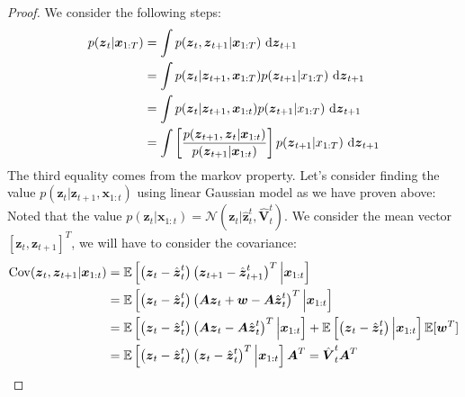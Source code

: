 \begin{proof}
    We consider the following steps:
    \begin{equation*}
    \begin{aligned}
        p(\boldsymbol z_t | \boldsymbol x_{1:T}) &= \int p(\boldsymbol z_t, \boldsymbol z_{t+1} | \boldsymbol x_{1:T})\ \mathrm{d} \boldsymbol z_{t+1} \\
        &= \int p(\boldsymbol z_t | \boldsymbol z_{t+1}, \boldsymbol x_{1:T}) p(\boldsymbol z_{t+1} | x_{1:T}) \ \mathrm{d} \boldsymbol z_{t+1} \\
        &= \int p(\boldsymbol z_t | \boldsymbol z_{t+1}, \boldsymbol x_{1:t}) p(\boldsymbol z_{t+1} | x_{1:T}) \ \mathrm{d} \boldsymbol z_{t+1} \\
        &= \int \left[ \frac{p(\boldsymbol z_{t+1}, \boldsymbol z_t | \boldsymbol x_{1:t})}{p(\boldsymbol z_{t+1} | \boldsymbol x_{1:t})} \right] p(\boldsymbol z_{t+1} | x_{1:T}) \ \mathrm{d} \boldsymbol z_{t+1}
    \end{aligned}
    \end{equation*}
    The third equality comes from the markov property. Let's consider finding the value $p(\boldsymbol z_t | \boldsymbol z_{t+1}, \boldsymbol x_{1:t})$ using linear Gaussian model as we have proven above: Noted that the value $p(\boldsymbol z_t | \boldsymbol x_{1:t}) = \mathcal{N}(\boldsymbol z_t | \hat{\boldsymbol z}^t_t, \hat{\boldsymbol V}^t_t)$. We consider the mean vector $[\boldsymbol z_t, \boldsymbol z_{t+1}]^T$, we will have to consider the covariance:
    \begin{equation*}
    \begin{aligned}
        \operatorname{Cov}(\boldsymbol z_t, \boldsymbol z_{t+1} | \boldsymbol x_{1:t}) &= \mathbb{E}\brackb{\bracka{\boldsymbol z_t - \hat{\boldsymbol z}^t_t}\bracka{\boldsymbol z_{t+1} - \hat{\boldsymbol z}^t_{t+1}}^T \Big| \boldsymbol x_{1:t} } \\
        &= \mathbb{E}\brackb{\bracka{\boldsymbol z_t - \hat{\boldsymbol z}^t_t}\bracka{\boldsymbol A\boldsymbol z_{t} + \boldsymbol w - \boldsymbol A\hat{\boldsymbol z}^t_{t}}^T \Big| \boldsymbol x_{1:t} } \\
        &= \mathbb{E}\brackb{\bracka{\boldsymbol z_t - \hat{\boldsymbol z}^t_t}\bracka{\boldsymbol A\boldsymbol z_{t} - \boldsymbol A\hat{\boldsymbol z}^t_{t}}^T \Big| \boldsymbol x_{1:t} } + \mathbb{E}\brackb{\bracka{\boldsymbol z_t - \hat{\boldsymbol z}^t_t} \Big| \boldsymbol x_{1:t} }\mathbb{E}[\boldsymbol w^T] \\
        &= \mathbb{E}\brackb{\bracka{\boldsymbol z_t - \hat{\boldsymbol z}^t_t}\bracka{\boldsymbol z_{t} - \hat{\boldsymbol z}^t_{t}}^T \Big| \boldsymbol x_{1:t} }\boldsymbol A^T = \hat{\boldsymbol V}^t_t \boldsymbol A^T \\

\end{aligned}
\end{equation*}
\end{proof}
